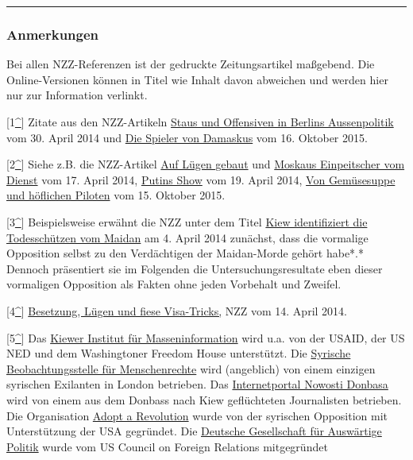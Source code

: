 \begin{center}\rule{0.5\linewidth}{\linethickness}\end{center}

\hypertarget{anmerkungen}{%
\subsubsection{Anmerkungen}\label{anmerkungen}}

Bei allen NZZ-Referenzen ist der gedruckte Zeitungsartikel maßgebend.
Die Online-Versionen können in Titel wie Inhalt davon abweichen und
werden hier nur zur Information verlinkt.

{[}1\protect\hyperlink{anmb1}{\^{}}{]} Zitate aus den NZZ-Artikeln
\href{http://www.nzz.ch/staus-und-offensiven-in-berlins-aussenpolitik-1.18293143}{Staus
und Offensiven in Berlins Aussenpolitik} vom 30. April 2014 und
\href{http://www.nzz.ch/meinung/kommentare/die-spieler-von-damaskus-ld.2506}{Die
Spieler von Damaskus} vom 16. Oktober 2015.

{[}2\protect\hyperlink{anmb2}{\^{}}{]} Siehe z.B. die NZZ-Artikel
\href{http://www.nzz.ch/das-luegen-karussell-dreht-sich-immer-schneller-1.18285557}{Auf
Lügen gebaut} und
\href{http://www.nzz.ch/moskaus-einpeitscher-vom-dienst-1.18285883}{Moskaus
Einpeitscher vom Dienst} vom 17. April 2014,
\href{http://www.nzz.ch/feuilleton/medien/die-putin-show-1.18314288}{Putins
Show} vom 19. April 2014,
\href{http://www.nzz.ch/international/europa/von-gemuesesuppe-und-hoeflichen-piloten-1.18629861}{Von
Gemüsesuppe und höflichen Piloten} vom 15. Oktober 2015.

{[}3\protect\hyperlink{anmb3}{\^{}}{]} Beispielsweise erwähnt die NZZ
unter dem Titel
\href{http://www.nzz.ch/kiew-identifiziert-die-todesschuetzen-1.18277076}{Kiew
identifiziert die Todesschützen vom Maidan} am 4. April 2014 zunächst,
dass die vormalige Opposition selbst zu den Verdächtigen der
Maidan-Morde gehört habe*.* Dennoch präsentiert sie im Folgenden die
Untersuchungs­resultate eben dieser vormaligen Opposition als Fakten
ohne jeden Vorbehalt und Zweifel.

{[}4\protect\hyperlink{anmb4}{\^{}}{]}
\href{http://www.nzz.ch/besetzung-luegen-und-fiese-visa-tricks-1.18283463}{Besetzung,
Lügen und fiese Visa-Tricks,} NZZ vom 14. April 2014.

{[}5\protect\hyperlink{anmb5}{\^{}}{]} Das
\href{http://imi.org.ua/en/}{Kiewer Institut für Massen­information}
wird u.a. von der USAID, der US NED und dem Washingtoner Freedom House
unterstützt. Die
\href{http://www.theguardian.com/commentisfree/2012/jul/12/syrian-opposition-doing-the-talking}{Syrische
Beobachtungs­stelle für Menschen­rechte} wird (angeblich) von einem
einzigen syrischen Exilanten in London betrieben. Das
\href{https://cpj.org/blog/2014/07/mission-journal-attacks-on-journalists-in-ukraine-.php}{Internetportal
Nowosti Donbasa} wird von einem aus dem Donbass nach Kiew geflüchteten
Journalisten betrieben. Die Organisation
\href{https://www.adoptrevolution.org/}{Adopt a Revolution} wurde von
der syrischen Opposition mit Unterstützung der USA gegründet. Die
\href{https://dgap.org/de}{Deutsche Gesellschaft für Auswärtige Politik}
wurde vom US Council on Foreign Relations mitgegründet

